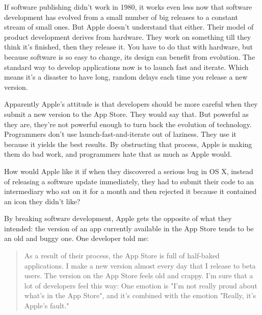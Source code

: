If software publishing
                    didn't work in 1980, it works even less now that software
                    development has evolved from a small number of big releases
                    to a constant stream of small ones. But Apple doesn't
                    understand that either. Their model of product development
                    derives from hardware. They work on something till they
                    think it's finished, then they release it. You have to do
                    that with hardware, but because software is so easy to
                    change, its design can benefit from evolution. The standard
                    way to develop applications now is to launch fast and
                    iterate. Which means it's a disaster to have long, random
                    delays each time you release a new version.

Apparently
                    Apple's attitude is that developers should be more careful
                    when they submit a new version to the App Store. They would
                    say that. But powerful as they are, they're not powerful
                    enough to turn back the evolution of technology. Programmers
                    don't use launch-fast-and-iterate out of laziness. They use
                    it because it yields the best results. By obstructing that
                    process, Apple is making them do bad work, and programmers
                    hate that as much as Apple would.

How would Apple
                    like it if when they discovered a serious bug in OS X,
                    instead of releasing a software update immediately, they had
                    to submit their code to an intermediary who sat on it for a
                    month and then rejected it because it contained an icon they
                    didn't like?

By breaking software development,
                    Apple gets the opposite of what they intended: the version
                    of an app currently available in the App Store tends to be
                    an old and buggy one. One developer told me:
                  

                  \begin{quote}

                    As a result of their process, the App Store is full of
                    half-baked applications. I make a new version almost every
                    day that I release to beta users. The version on the App
                    Store feels old and crappy. I'm sure that a lot of
                    developers feel this way: One emotion is "I'm not really
                    proud about what's in the App Store", and it's combined with
                    the emotion "Really, it's Apple's fault."
                  
\end{quote}

